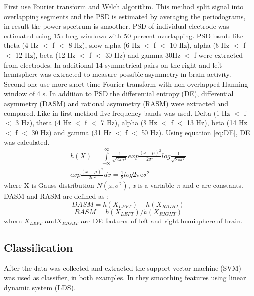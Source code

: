\documentclass[10pt,journal,compsoc,twoside]{IEEEtran}
\newcommand{\Ref}[2]{#2 \ref{#1}}
\newcommand{\fromto}[5]{(#1 #3 $<$ #4 $<$ #2 #3)}
\newcommand{\me}{\mathrm{e}}
\begin{document}
First \cite{WeiLongBoNanBaoLiang2014} use Fourier transform and Welch algorithm. This method split signal into overlapping segments and the PSD is estimated by averaging the periodograms, in result the power spectrum is smoother. PSD of individual electrode was estimated using 15s long windows with 50 percent overlapping. PSD bands like theta \fromto{4}{8}{Hz}{f} \  ,  slow alpha \fromto{6}{10}{Hz}{f} \  ,  alpha \fromto{8}{12}{Hz}{f} \  ,  beta \fromto{12}{30}{Hz}{f} \\  and  gamma 30Hz $<$ f were extracted from electrodes. In additional 14 symmetrical pairs on the right and left hemisphere was extracted to measure possible asymmetry in brain activity.
\newline
\newline
Second one use more short-time Fourier transform with non-overlapped Hanning window of 4 s. In addition to PSD the differential entropy (DE), differential asymmetry (DASM) and rational asymmetry (RASM) were extracted and compared. Like in first method five frequency bands was used. Delta \fromto{1}{3}{Hz}{f} \  ,  theta \fromto{4}{7}{Hz}{f} \  ,  alpha \fromto{8}{13}{Hz}{f} \  ,  beta \fromto{14}{30}{Hz}{f} \\ and  gamma \fromto{31}{50}{Hz}{f} \,. Using \Ref{eq:DE}{equation}, DE was calculated.
\begin{equation}
\begin{aligned}
h(X)=\int\limits_{-\infty}^{\infty} \frac{1}{\sqrt{2\pi\sigma^{2}}}exp \frac{(x - \mu)^{2}}{2\sigma^{2}}log\frac{1}{\sqrt{2\pi\sigma^{2}}}\\ exp\frac{(x - \mu)^{2}}{2\sigma^{2}}dx = \frac{1}{2}log2\pi \me \sigma^{2}
\end{aligned}
\label{eq:DE}
\end{equation}
where X is Gauss distribution $N(\mu, \sigma^2)$, \textit{x} is a variable $\pi$ and $\me$ are constants. DASM and RASM are defined as :
\begin{equation}
DASM = h(X_{LEFT}) - h(X_{RIGHT})
\end{equation}
\begin{equation}
RASM = h(X_{LEFT}) / h(X_{RIGHT})
\end{equation}
where $X_{LEFT}$ and$X_{RIGHT}$ are DE features of left and right hemisphere of brain.
\newpage
\subsection{Classification}
After the data was collected and extracted the support vector machine (SVM) was used as classifier, in both examples.
In  \cite{WeiLongBoNanBaoLiang2014} they smoothing features using linear dynamic system (LDS).
\end{document}
